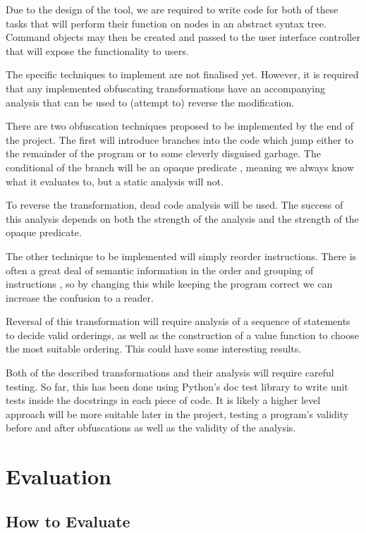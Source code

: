 \documentclass{report}
\begin{document}
Due to the design of the tool, we are required to write code for both of these tasks
that will perform their function on nodes in an abstract syntax tree. Command objects may then be
created and passed to the user interface controller that will expose the functionality
to users.

The specific techniques to implement are not finalised yet. However, it is required that
any implemented obfuscating transformations have an accompanying analysis that can be
used to (attempt to) reverse the modification.

There are two obfuscation techniques proposed to be implemented by the end of the project.
The first will introduce branches into the code which jump either to the remainder of the program
or to some cleverly disguised garbage. The conditional of the branch will be an opaque predicate
\cite{taxobftrans}, meaning we always know what it evaluates to, but a static analysis will not.

To reverse the transformation, dead code analysis will be used. The success of this analysis
depends on both the strength of the analysis and the strength of the opaque predicate.

The other technique to be implemented will simply reorder instructions. There is often a
great deal of semantic information in the order and grouping of instructions
\cite{taxobftrans}, so by changing this while keeping the program correct we can increase
the confusion to a reader.

Reversal of this transformation will require analysis of a sequence of statements to decide
valid orderings, as well as the construction of a value function to choose the most suitable
ordering. This could have some interesting results.

Both of the described transformations and their analysis will require careful testing. So far,
this has been done using Python's doc test library to write unit tests inside the docstrings
in each piece of code. It is likely a higher level approach will be more suitable later in
the project, testing a program's validity before and after obfuscations as well as the validity
of the analysis.

\section{Evaluation}

\subsection{How to Evaluate}
\end{document}

